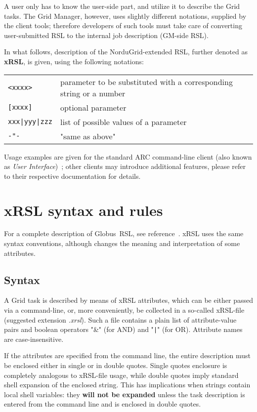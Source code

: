 \documentclass{book}
\newcommand{\globus}{Globus\textsuperscript{\textregistered}}
\begin{document}
  A user only has to know the user-side part, and utilize it to
  describe the Grid tasks. The Grid Manager, however, uses slightly
  different notations, supplied by the client tools; therefore developers of such tools must take care of converting user-submitted RSL to the internal job description (GM-side RSL).

  In what follows, description of the NorduGrid-extended RSL,
  further denoted as \textbf{xRSL}, is given, using the
  following notations:

  \begin{tabular}{ll}
    \verb#<xxxx>#&parameter to be substituted with a corresponding string or a number\\
    \verb#[xxxx]# & optional parameter\\
    \verb#xxx|yyy|zzz# &list of possible values of a parameter\\
    \verb#-"-# &"same as above"\\
  \end{tabular}

Usage examples are given for the standard ARC command-line client (also known as \textit{User Interface})~\cite{ui}; other clients may introduce additional features, please refer to their respective documentation for details.

  \chapter{xRSL syntax and rules}
  \label{sec:remarks}

  For a complete description of \globus\  RSL, see
  reference~\cite{rsl}. xRSL uses the same syntax conventions,
  although changes the meaning and interpretation of some attributes.

  \section{Syntax}
  \label{sec:syntax}

  A Grid task is described by means of xRSL attributes, which can
  be either passed via a command-line, or, more conveniently, be
  collected in a so-called xRSL-file (suggested extension
  \textit{.xrsl}). Such a file contains a plain list of attribute-value pairs
  and boolean operators "\&" (for AND) and "\verb#|#" (for
  OR). Attribute names are case-insensitive.

  If the attributes are specified from the command line, the entire
  description must be enclosed either in single or in double quotes.
  Single quotes enclosure is completely analogous to xRSL-file usage,
  while double quotes imply standard shell expansion of the enclosed
  string. This has implications when strings contain local shell
  variables: they \textbf{will not be expanded} unless the task description is
  entered from the command line and is enclosed in double quotes.
\end{document}
